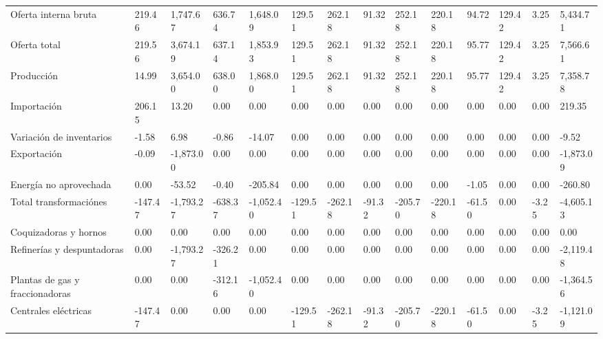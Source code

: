 \documentclass{sener2025}
\begin{document}
\begin{tabladoradoLargo}
\begin{xltabular}{\textwidth}{QZZZZZZZZZZZZZ}
    Oferta interna bruta & 219.46 & 1,747.67 & 636.74 & 1,648.09 & 129.51 & 262.18 & 91.32 & 252.18 & 220.18 & 94.72 & 129.42 & 3.25 & 5,434.71 \\
    \hspace{1.35em} Oferta total & 219.56 & 3,674.19 & 637.14 & 1,853.93 & 129.51 & 262.18 & 91.32 & 252.18 & 220.18 & 95.77 & 129.42 & 3.25 & 7,566.61 \\
    \hspace{2.7em} Producción & 14.99 & 3,654.00 & 638.00 & 1,868.00 & 129.51 & 262.18 & 91.32 & 252.18 & 220.18 & 95.77 & 129.42 & 3.25 & 7,358.78 \\
    \hspace{2.7em} Importación & 206.15 & 13.20 & 0.00 & 0.00 & 0.00 & 0.00 & 0.00 & 0.00 & 0.00 & 0.00 & 0.00 & 0.00 & 219.35 \\
    \hspace{2.7em} Variación de inventarios & -1.58 & 6.98 & -0.86 & -14.07 & 0.00 & 0.00 & 0.00 & 0.00 & 0.00 & 0.00 & 0.00 & 0.00 & -9.52 \\
    \hspace{1.35em} Exportación & -0.09 & -1,873.00 & 0.00 & 0.00 & 0.00 & 0.00 & 0.00 & 0.00 & 0.00 & 0.00 & 0.00 & 0.00 & -1,873.09 \\
    \hspace{1.35em} Energía no aprovechada & 0.00 & -53.52 & -0.40 & -205.84 & 0.00 & 0.00 & 0.00 & 0.00 & 0.00 & -1.05 & 0.00 & 0.00 & -260.80 \\
    Total transformaciónes & -147.47 & -1,793.27 & -638.37 & -1,052.40 & -129.51 & -262.18 & -91.32 & -205.70 & -220.18 & -61.50 & 0.00 & -3.25 & -4,605.13 \\
    \hspace{1.35em} Coquizadoras y hornos & 0.00 & 0.00 & 0.00 & 0.00 & 0.00 & 0.00 & 0.00 & 0.00 & 0.00 & 0.00 & 0.00 & 0.00 & 0.00 \\
    \hspace{1.35em} Refinerías y despuntadoras & 0.00 & -1,793.27 & -326.21 & 0.00 & 0.00 & 0.00 & 0.00 & 0.00 & 0.00 & 0.00 & 0.00 & 0.00 & -2,119.48 \\
    \hspace{1.35em} Plantas de gas y fraccionadoras & 0.00 & 0.00 & -312.16 & -1,052.40 & 0.00 & 0.00 & 0.00 & 0.00 & 0.00 & 0.00 & 0.00 & 0.00 & -1,364.56 \\
    \hspace{1.35em} Centrales eléctricas & -147.47 & 0.00 & 0.00 & 0.00 & -129.51 & -262.18 & -91.32 & -205.70 & -220.18 & -61.50 & 0.00 & -3.25 & -1,121.09 \\

\end{xltabular}
\end{tabladoradoLargo}
\end{document}
